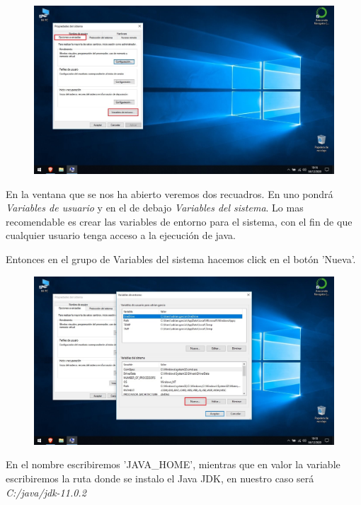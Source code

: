 \documentclass[a4paper,10pt]{article}
\begin{document}
\begin{figure}[H]
\begin{center}
\includegraphics[width=425pt]{./fotos/introduccion/8 - Java (V).jpg}
\end{center}
\end{figure}

En la ventana que se nos ha abierto veremos dos recuadros. En uno pondrá \textit{Variables de usuario} y en el de debajo \textit{Variables del sistema}. Lo mas recomendable es crear las variables de entorno para el sistema, con el fin de que cualquier usuario tenga acceso a la ejecución de java. 

Entonces en el grupo de Variables del sistema hacemos click en el botón 'Nueva'.

\begin{figure}[H]
\begin{center}
\includegraphics[width=450pt]{./fotos/introduccion/9 - Java (V).jpg}
\end{center}
\end{figure}

En el nombre escribiremos 'JAVA\_HOME', mientras que en valor la variable escribiremos la ruta donde se instalo el Java JDK, en nuestro caso será \textit{C:/java/jdk-11.0.2}
\end{document}
